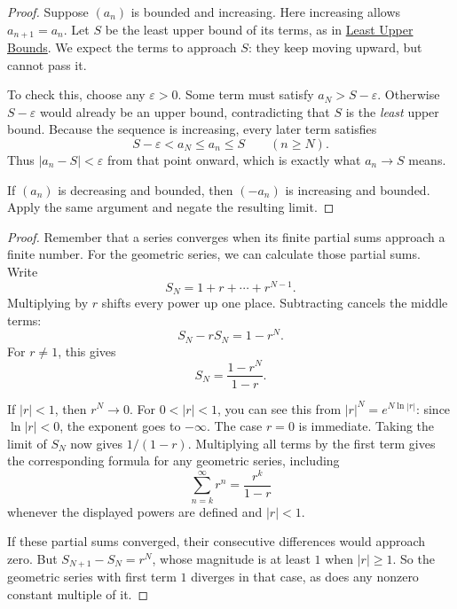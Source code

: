 

\begin{proof}
Suppose $(a_n)$ is bounded and increasing. Here increasing allows
$a_{n+1}=a_n$. Let $S$ be the least upper bound of its terms, as in
\hyperref[sec:least-upper-bounds]{Least Upper Bounds}. We expect the
terms to approach $S$: they keep moving upward, but cannot pass it.

To check this, choose any $\varepsilon>0$. Some term must satisfy
$a_N>S-\varepsilon$. Otherwise $S-\varepsilon$ would already be an upper
bound, contradicting that $S$ is the \textit{least} upper bound. Because
the sequence is increasing, every later term satisfies
$$S-\varepsilon<a_N\leq a_n\leq S\qquad(n\geq N).$$
Thus $|a_n-S|<\varepsilon$ from that point onward, which is exactly what
$a_n\to S$ means.

If $(a_n)$ is decreasing and bounded, then $(-a_n)$ is increasing and
bounded. Apply the same argument and negate the resulting limit.
\end{proof}



\begin{proof}
Remember that a series converges when its finite partial sums approach
a finite number. For the geometric series, we can calculate those
partial sums. Write
$$S_N=1+r+\cdots+r^{N-1}.$$
Multiplying by $r$ shifts every power up one place. Subtracting cancels
the middle terms:
$$S_N-rS_N=1-r^N.$$
For $r\ne1$, this gives
$$S_N=\frac{1-r^N}{1-r}.$$

If $|r|<1$, then $r^N\to0$. For $0<|r|<1$, you can see this from
$|r|^N=e^{N\ln|r|}$: since $\ln|r|<0$, the exponent goes to $-\infty$.
The case $r=0$ is immediate. Taking the limit of $S_N$ now gives
$1/(1-r)$. Multiplying all terms by the first term gives the corresponding
formula for any geometric series, including
$$\sum_{n=k}^{\infty}r^n=\frac{r^k}{1-r}$$
whenever the displayed powers are defined and $|r|<1$.

If these partial sums converged, their consecutive differences would
approach zero. But $S_{N+1}-S_N=r^N$, whose magnitude is at least $1$
when $|r|\geq1$. So the geometric series with first term $1$ diverges
in that case, as does any nonzero constant multiple of it.
\end{proof}

